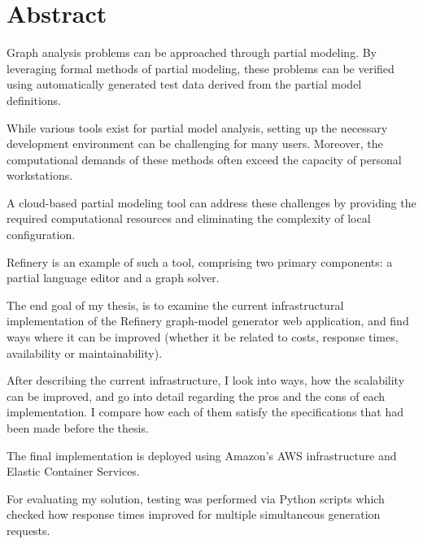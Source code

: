 \vfill
\selectenglish


\chapter*{Abstract}
	Graph analysis problems can be approached through partial modeling. 
	By leveraging formal methods of partial modeling, these problems can be verified using 
	automatically generated test data derived from the partial model definitions. 

	While various tools exist for partial model analysis, setting up the necessary development 
	environment can be challenging for many users. Moreover, the computational demands of 
	these methods often exceed the capacity of personal workstations.

	A cloud-based partial modeling tool can address these challenges by providing the required 
	computational resources and eliminating the complexity of local configuration. 
	
	Refinery 
	is an example of such a tool, comprising two primary components: a partial language editor and a graph solver.

	The end goal of my thesis, is to examine the current infrastructural implementation of the Refinery graph-model
	generator web application, and find ways where it can be improved (whether it be related to costs, response times,
	availability or maintainability).

	After describing the current infrastructure, I look into ways, how the scalability can be improved,
	and go into detail regarding the pros and the cons of each implementation. I compare how each of them
	satisfy the specifications that had been made before the thesis.

	The final implementation is deployed using Amazon's AWS infrastructure and Elastic Container Services. 
	
	For evaluating my solution, testing was performed via Python scripts
	which checked how response times improved for multiple simultaneous generation requests.



\vfill
\cleardoublepage

\selectthesislanguage

\setcounter{romanPage}{\value{page}}
